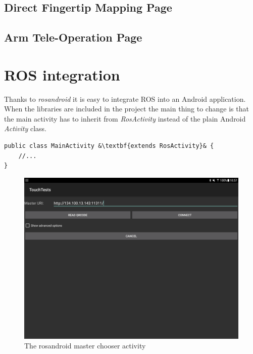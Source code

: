 \subsection{Direct Fingertip Mapping Page}

\subsection{Arm Tele-Operation Page}
\label{sec:impl:armteleop}

\section{ROS integration}

Thanks to \textit{rosandroid} it is easy to integrate ROS into an Android application. When the libraries are included in the project the main thing to change is that the main activity has to inherit from \textit{RosActivity} instead of the plain Android \textit{Activity} class.

\begin{lstlisting}[caption={Changes to MainActivity}, escapechar=&]
public class MainActivity &\textbf{extends RosActivity}& {
	//...
}
\end{lstlisting}

\begin{figure}
\caption{\label{fig:impl:masterchooser}The rosandroid master chooser activity}
\includegraphics[width=\linewidth]{assets/chpt_impl/masterchooser}	
\end{figure}

